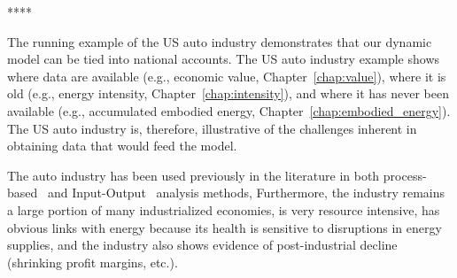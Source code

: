 ****

The running example of the US auto industry demonstrates that our dynamic model 
can be tied into national accounts.
The US auto industry example shows where data are available 
(e.g., economic value, Chapter~\ref{chap:value}), 
where it is old (e.g., energy intensity, Chapter~\ref{chap:intensity}), 
and where it has never been available 
(e.g., accumulated embodied energy, Chapter~\ref{chap:embodied_energy}).  
The US auto industry is, therefore, 
illustrative of the challenges inherent 
in obtaining data that would feed the model.

The auto industry 
has been used previously
in the literature in both 
process-based~\cite{Berry:1973vo, Sullivan1995, Stodolsky1995, 
							Sullivan1998, McCleese2002, Sullivan2010, Hawkins2012}
and Input-Output~\cite{Bullard:1978vd, MacLean1998, MacLean2003}
analysis methods,
Furthermore, the industry
remains a large portion of many industrialized economies, 
is very resource intensive, 
has obvious links with energy because
its health is sensitive to disruptions in energy supplies, and
the industry also shows evidence of 
post-industrial decline (shrinking profit margins, etc.).












